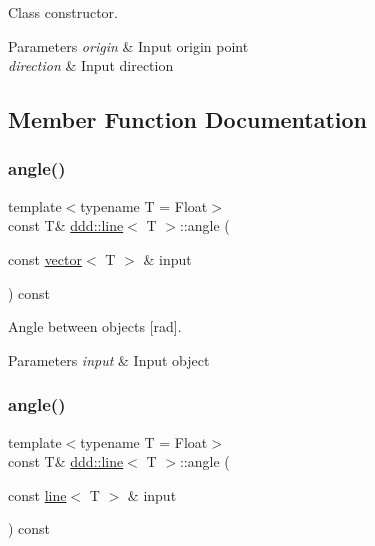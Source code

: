 Class constructor. 


\begin{DoxyParams}{Parameters}
{\em origin} & Input origin point \\
\hline
{\em direction} & Input direction \\
\hline
\end{DoxyParams}


\subsection{Member Function Documentation}
\mbox{\label{classddd_1_1line_a467a7bb3964141ec5e84f4187cdf4099}} 
\subsubsection{\texorpdfstring{angle()}{angle()}\hspace{0.1cm}{\footnotesize\ttfamily [1/5]}}
{\footnotesize\ttfamily template$<$typename T = Float$>$ \\
const T\& \hyperlink{classddd_1_1line}{ddd\+::line}$<$ T $>$\+::angle (\begin{DoxyParamCaption}\item[{const \hyperlink{classddd_1_1vector}{vector}$<$ T $>$ \&}]{input }\end{DoxyParamCaption}) const\hspace{0.3cm}{\ttfamily [inline]}}



Angle between objects \mbox{[}rad\mbox{]}. 


\begin{DoxyParams}{Parameters}
{\em input} & Input object \\
\hline
\end{DoxyParams}
\mbox{\label{classddd_1_1line_a3ce8f1109a657e646d0c334b19c79f53}} 
\subsubsection{\texorpdfstring{angle()}{angle()}\hspace{0.1cm}{\footnotesize\ttfamily [2/5]}}
{\footnotesize\ttfamily template$<$typename T = Float$>$ \\
const T\& \hyperlink{classddd_1_1line}{ddd\+::line}$<$ T $>$\+::angle (\begin{DoxyParamCaption}\item[{const \hyperlink{classddd_1_1line}{line}$<$ T $>$ \&}]{input }\end{DoxyParamCaption}) const\hspace{0.3cm}{\ttfamily [inline]}}



